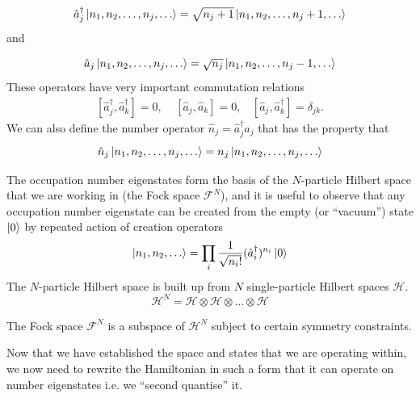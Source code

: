\documentclass[a4paper,10pt]{article}
\begin{document}
\begin{equation}
 \hat{a}_{j}^{\dagger}\ket{n_1,n_2,\dots,n_{j},\dots}=\sqrt{n_j+1}\ket{n_1,n_2,\dots,n_{j}+1,\dots}
\end{equation}
and 

\begin{equation}
 \hat{a}_{j}\ket{n_1,n_2,\dots,n_{j},\dots}=\sqrt{n_j}\ket{n_1,n_2,\dots,n_{j}-1,\dots}
\end{equation}
These operators have very important commutation relations
\begin{equation}
\begin{align*}
 [\hat{a}_{j}^{\dagger},\hat{a}_{k}^{\dagger}]=0, \ \ \ \ \ [\hat{a}_{j},\hat{a}_{k}]=0,\ \ \ \ [\hat{a}_{j},\hat{a}_{k}^{\dagger}]=\delta_{jk}.
 \end{align*}
\end{equation}
We can also define the number operator $\hat{n}_j=\hat{a}_{j}^{\dagger}\hat{a}_j$ that has the property that
\begin{equation}
 \hat{n}_{j}\ket{n_1,n_2,\dots,n_{j},\dots}=n_{j}\ket{n_1,n_2,\dots,n_{j},\dots}
\end{equation}

The occupation number eigenstates form the basis of the $N$-particle Hilbert space that we are working in (the Fock space $\mathcal{F}^N$), and it 
is useful to observe that any occupation number eigenstate can be created from the empty (or ``vacuum'') state $\ket{0}$ by repeated action of 
creation operators
\begin{equation}
 \ket{n_1,n_2,\dots}=\prod_i\frac{1}{\sqrt{n_i!}}(\hat{a}_i^{\dagger})^{n_i}\ket{0}
\end{equation}
The $N$-particle Hilbert space is built up from $N$ single-particle Hilbert spaces $\mathcal{H}$.
\begin{equation}
 \mathcal{H}^N=\mathcal{H}\otimes \mathcal{H} \otimes \dots\otimes \mathcal{H}
\end{equation}

The Fock space $\mathcal{F}^N$ is a subspace of $\mathcal{H}^N$ subject to certain symmetry constraints.

Now that we have established the space and states that we are operating within, we now need to rewrite the Hamiltonian in such a form that it can operate on number eigenstates i.e. we 
``second quantise'' it.
\end{document}
